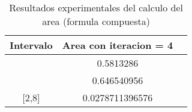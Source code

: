 \begin{table}[!ht]
\begin{center}
\begin{tabular}{|c||c||c|} \hline 
\textbf{Intervalo} & \textbf{Area con iteracion = 4}  \\ \hline \hline
[-1,1] &  0.5813286
\\
\hline
[-1,4] & 0.646540956
\\
\hline

[2,8] & 0.0278711396576
\\
\hline
\hline

\end{tabular}
\end{center}
\caption{Resultados experimentales del calculo del area (formula compuesta)}
\label{tab:2}
\end{table}
